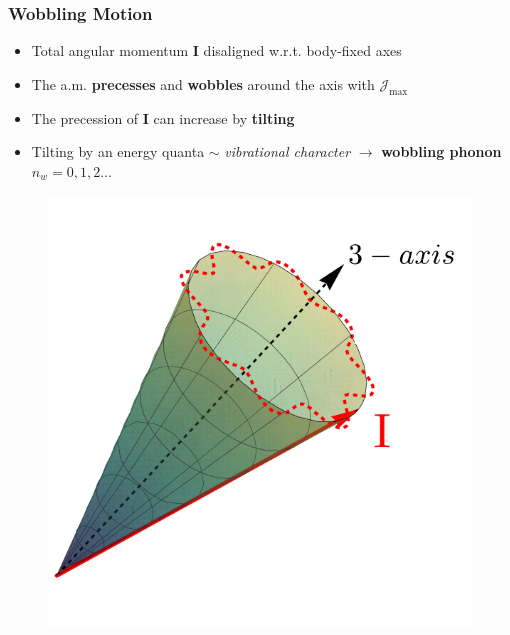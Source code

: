 \documentclass{beamer}
\begin{document}
\begin{frame}
  \frametitle{Wobbling Motion}
\begin{itemize}
  \item Total angular momentum $\mathbf{I}$ disaligned w.r.t. body-fixed axes
  \item The a.m. \textbf{precesses} and \textbf{wobbles} around the axis with $\mathcal{J}_\text{max}$
  \item The precession of $\mathbf{I}$ can increase by \textbf{tilting} 
  \item Tilting by an energy quanta $\sim$ \emph{vibrational character} $\rightarrow$ \textbf{wobbling phonon} $n_w=0,1,2...$
\end{itemize}
  \begin{figure}
    \centering
    \includegraphics[scale=0.42]{Figs/precessional_cone_2.pdf}

\end{figure}
\end{frame}
\end{document}
